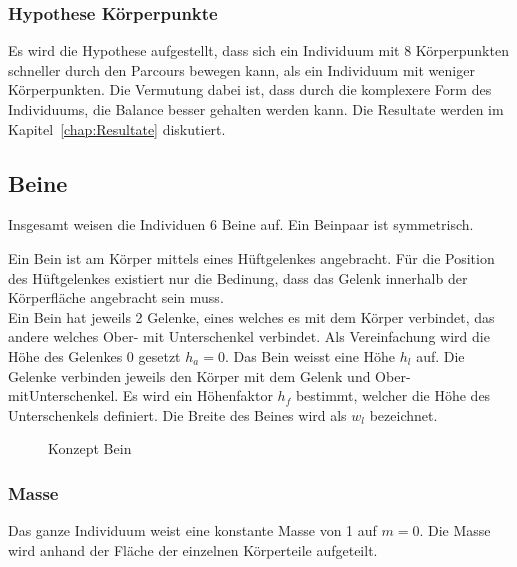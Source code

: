       \subsubsection{Hypothese Körperpunkte\label{subsub:hypoKp}}

        Es wird die Hypothese aufgestellt,
        dass sich ein Individuum mit 8 Körperpunkten schneller durch den Parcours bewegen kann,
        als ein Individuum mit weniger Körperpunkten.
        Die Vermutung dabei ist, dass durch die komplexere Form des Individuums,
        die Balance besser gehalten werden kann.
        Die Resultate werden im Kapitel~\ref{chap:Resultate} diskutiert.

    \subsection{Beine\label{sub:Beine}}

      Insgesamt weisen die Individuen 6 Beine auf.
      Ein Beinpaar ist symmetrisch.


      Ein Bein ist am Körper mittels eines Hüftgelenkes angebracht.
      Für die Position des Hüftgelenkes existiert nur die Bedinung,
      dass das Gelenk innerhalb der Körperfläche angebracht sein muss.
      \\
      Ein Bein hat jeweils 2 Gelenke, eines welches es mit dem Körper verbindet,
      das andere welches Ober- mit Unterschenkel verbindet.
      Als Vereinfachung wird die Höhe des Gelenkes 0 gesetzt \(h_{a} = 0\).
      Das Bein weisst eine Höhe \(h_{l}\) auf.
      Die Gelenke verbinden jeweils den Körper mit dem Gelenk und Ober- mitUnterschenkel.
      Es wird ein Höhenfaktor \(h_f\) bestimmt, welcher die Höhe des Unterschenkels definiert.
      Die Breite des Beines wird als \(w_{l}\) bezeichnet.

      \begin{figure}[H]
        \centering
        
        \caption{Konzept Bein\label{fig:conceptLeg}}
      \end{figure}

      \subsubsection{Masse\label{subs:Masse}}

        Das ganze Individuum weist eine konstante Masse von 1 auf \(m = 0\).
        Die Masse wird anhand der Fläche der einzelnen Körperteile aufgeteilt.

